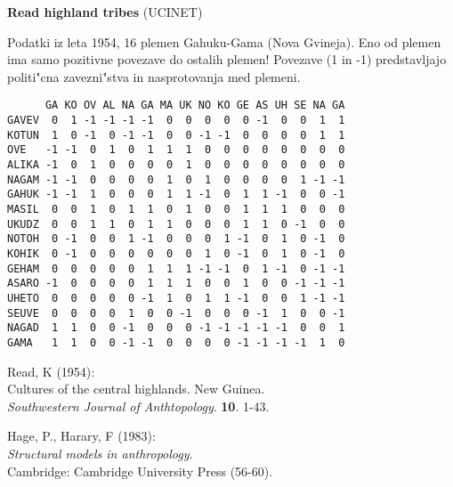 \documentclass[12pt,a4paper]{article}
\begin{document}
\pagestyle{empty}
{\bf Read highland tribes}  (UCINET)

Podatki iz leta 1954, 16 plemen Gahuku-Gama (Nova Gvineja). 
Eno od plemen ima samo pozitivne povezave do ostalih plemen!
Povezave (1 in -1) predstavljajo politi"cna zavezni"stva in nasprotovanja 
med plemeni.

\begin{small}
\begin{verbatim}
      GA KO OV AL NA GA MA UK NO KO GE AS UH SE NA GA
GAVEV  0  1 -1 -1 -1 -1  0  0  0  0  0 -1  0  0  1  1
KOTUN  1  0 -1  0 -1 -1  0  0 -1 -1  0  0  0  0  1  1
OVE   -1 -1  0  1  0  1  1  1  0  0  0  0  0  0  0  0
ALIKA -1  0  1  0  0  0  0  1  0  0  0  0  0  0  0  0
NAGAM -1 -1  0  0  0  0  1  0  1  0  0  0  0  1 -1 -1
GAHUK -1 -1  1  0  0  0  1  1 -1  0  1  1 -1  0  0 -1
MASIL  0  0  1  0  1  1  0  1  0  0  1  1  1  0  0  0
UKUDZ  0  0  1  1  0  1  1  0  0  0  1  1  0 -1  0  0
NOTOH  0 -1  0  0  1 -1  0  0  0  1 -1  0  1  0 -1  0
KOHIK  0 -1  0  0  0  0  0  0  1  0 -1  0  1  0 -1  0
GEHAM  0  0  0  0  0  1  1  1 -1 -1  0  1 -1  0 -1 -1
ASARO -1  0  0  0  0  1  1  1  0  0  1  0  0 -1 -1 -1
UHETO  0  0  0  0  0 -1  1  0  1  1 -1  0  0  1 -1 -1
SEUVE  0  0  0  0  1  0  0 -1  0  0  0 -1  1  0  0 -1
NAGAD  1  1  0  0 -1  0  0  0 -1 -1 -1 -1 -1  0  0  1
GAMA   1  1  0  0 -1 -1  0  0  0  0 -1 -1 -1 -1  1  0
\end{verbatim}
\end{small}

Read, K (1954):\\
Cultures of the central highlands. New Guinea.\\
{\em Southwestern Journal of Anthtopology}. {\bf 10}. 1-43.

Hage, P., Harary, F (1983): \\
{\em Structural models in anthropology.}\\
Cambridge: Cambridge University Press (56-60).
\end{document}
